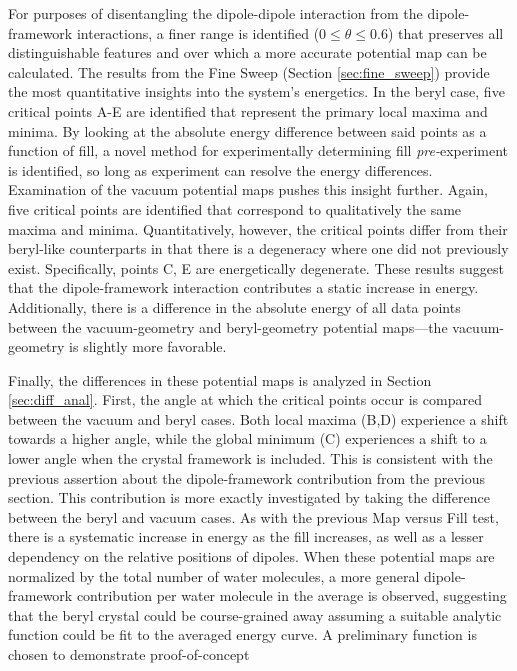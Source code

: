     For purposes of disentangling the dipole-dipole interaction from the dipole-framework interactions, a finer range is identified ($0\le\theta\le0.6$) that preserves all distinguishable features and over which a more accurate potential map can be calculated. The results from the Fine Sweep (Section \ref{sec:fine_sweep}) provide the most quantitative insights into the system's energetics. In the beryl case, five critical points A-E are identified that represent the primary local maxima and minima. By looking at the absolute energy difference between said points as a function of fill, a novel method for experimentally determining fill \textit{pre-}experiment is identified, so long as experiment can resolve the energy differences. Examination of the vacuum potential maps pushes this insight further. Again, five critical points are identified that correspond to qualitatively the same maxima and minima. Quantitatively, however, the critical points differ from their beryl-like counterparts in that there is a degeneracy where one did not previously exist. Specifically, points C, E are energetically degenerate. These results suggest that the dipole-framework interaction contributes a static increase in energy. Additionally, there is a difference in the absolute energy of all data points between the vacuum-geometry and beryl-geometry potential maps---the vacuum-geometry is slightly more favorable.
    
    Finally, the differences in these potential maps is analyzed in Section \ref{sec:diff_anal}. First, the angle at which the critical points occur is compared between the vacuum and beryl cases. Both local maxima (B,D) experience a shift towards a higher angle, while the global minimum (C) experiences a shift to a lower angle when the crystal framework is included. This is consistent with the previous assertion about the dipole-framework contribution from the previous section. This contribution is more exactly investigated by taking the difference between the beryl and vacuum cases. As with the previous Map versus Fill test, there is a systematic increase in energy as the fill increases, as well as a lesser dependency on the relative positions of dipoles. When these potential maps are normalized by the total number of water molecules, a more general dipole-framework contribution per water molecule in the average is observed, suggesting that the beryl crystal could be course-grained away assuming a suitable analytic function could be fit to the averaged energy curve. A preliminary function is chosen to demonstrate proof-of-concept
    
